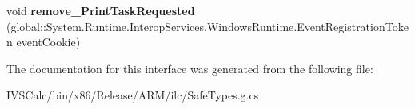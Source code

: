 \begin{DoxyCompactItemize}
\item 
\mbox{\label{interface_windows_1_1_graphics_1_1_printing_1_1_i_print_manager_a9fc2ea04a3aea1a103a829815f1cbc9d}} 
void {\bfseries remove\+\_\+\+Print\+Task\+Requested} (global\+::\+System.\+Runtime.\+Interop\+Services.\+Windows\+Runtime.\+Event\+Registration\+Token event\+Cookie)
\end{DoxyCompactItemize}


The documentation for this interface was generated from the following file\+:\begin{DoxyCompactItemize}
\item 
I\+V\+S\+Calc/bin/x86/\+Release/\+A\+R\+M/ilc/Safe\+Types.\+g.\+cs\end{DoxyCompactItemize}
